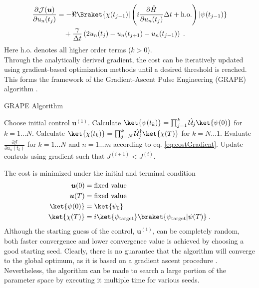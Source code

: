 \begin{align}
	\frac{\partial \mathcal{J} (\boldsymbol{u})}{\partial u_n (t_j)}  &= - \Re \Braket{\chi (t_{j-1}) | \left( i \frac{\partial \hat{H}}{\partial u_n (t_j)} \Delta t + \mathrm{h.o.} \right)  | \psi (t_{j-1})}  \nonumber \\
	& \quad + \frac{\gamma}{\Delta t} \left( 2 u_n (t_j) - u_n (t_{j+1}) - u_n (t_{j-1}) \right) \; .
	\label{eq:costGradient}
\end{align}
Here $\mathrm{h.o.}$ denotes all higher order terms ($k > 0$).\\ 
Through the analytically derived gradient, the cost can be iteratively updated using gradient-based optimization methods until a desired threshold is reached. This forms the framework of the Gradient-Ascent Pulse Engineering (GRAPE) algorithm \cite{Khaneja2005}.
\begin{algorithm}
\begin{algorithmic}
\caption{GRAPE Algorithm}
\State Choose initial control $\boldsymbol{u}^{(1)}$.
	\State Calculate $\ket{\psi (t_k)} = \prod_{j=1}^{k} \hat{\mathcal{U}}_j \ket{\psi (0)}$ for $k = 1 \ldots N$.
	\State Calculate $\ket{\chi (t_k)} = \prod_{j=N}^{k} \hat{\mathcal{U}}_{j}^{\dag} \ket{\chi (T)}$ for $k = N \ldots 1$. 
	\State Evaluate $\frac{\partial \mathcal{J}}{\partial u_n (t_k)}$ for $k = 1 \ldots N$ and $n = 1 \ldots m$ according to eq. \eqref{eq:costGradient}.
	\State Update controls using gradient such that $J^{(i + 1)} < J^{(i)}$. 
\EndWhile
\end{algorithmic}
\end{algorithm}
The cost is minimized under the initial and terminal condition
\begin{align}
	\boldsymbol{u}(0) &= \text{fixed value} \label{eq:firstBound} \\
	\boldsymbol{u}(T) &= \text{fixed value} \\
	\ket{\psi (0)} &= \ket{\psi_0} \\
	\ket{\chi (T)} &= i \ket{\psi_{\mathrm{target}}} \braket{\psi_{\mathrm{target}} | \psi (T)} \; .  \label{eq:lastBound}
\end{align}
Although the starting guess of the control, $\boldsymbol{u}^{(1)}$, can be completely random, both faster convergence and lower convergence value is achieved by choosing a good starting seed. Clearly, there is no guarantee that the algorithm will converge to the global optimum, as it is based on a gradient ascent procedure \cite{Khaneja2005}. Nevertheless, the algorithm can be made to search a large portion of the parameter space by executing it multiple time for various seeds.  

